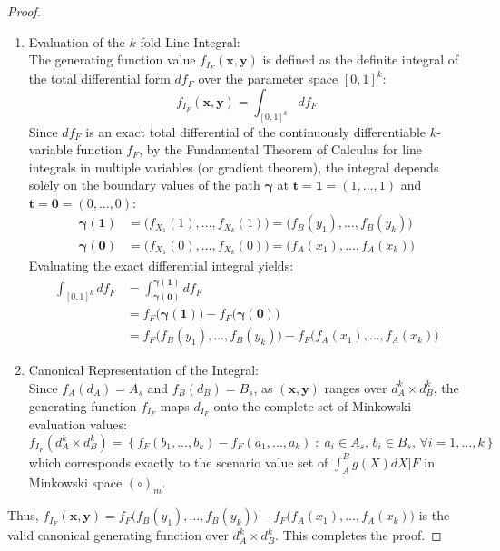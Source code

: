 \documentclass[a4paper,12pt, twoside]{memoir}
\begin{document}
\begin{proof}
\begin{enumerate}[leftmargin=*]
		\item Evaluation of the $k$-fold Line Integral: \\
		      The generating function value $f_{I_F}(\mathbf{x}, \mathbf{y})$ is defined as the definite integral of the total differential form $df_F$ over the parameter space $[0, 1]^k$:
		      \[
			      f_{I_F}(\mathbf{x}, \mathbf{y}) = \int_{[0, 1]^k} d f_F
		      \]
		      Since $df_F$ is an exact total differential of the continuously differentiable $k$-variable function $f_F$, by the Fundamental Theorem of Calculus for line integrals in multiple variables (or gradient theorem), the integral depends solely on the boundary values of the path $\boldsymbol{\gamma}$ at $\mathbf{t} = \mathbf{1} = (1, \dots, 1)$ and $\mathbf{t} = \mathbf{0} = (0, \dots, 0)$:
		      \begin{align*}
			      \boldsymbol{\gamma}(\mathbf{1}) & = \big(f_{X_1}(1), \dots, f_{X_k}(1)\big) = \big(f_B(y_1), \dots, f_B(y_k)\big) \\
			      \boldsymbol{\gamma}(\mathbf{0}) & = \big(f_{X_1}(0), \dots, f_{X_k}(0)\big) = \big(f_A(x_1), \dots, f_A(x_k)\big)
		      \end{align*}
		      Evaluating the exact differential integral yields:
		      \begin{align*}
			      \int_{[0, 1]^k} d f_F & = \int_{\boldsymbol{\gamma}(\mathbf{0})}^{\boldsymbol{\gamma}(\mathbf{1})} d f_F              \\
			                            & = f_F\big(\boldsymbol{\gamma}(\mathbf{1})\big) - f_F\big(\boldsymbol{\gamma}(\mathbf{0})\big) \\
			                            & = f_F\big(f_B(y_1), \dots, f_B(y_k)\big) - f_F\big(f_A(x_1), \dots, f_A(x_k)\big)
		      \end{align*}

		\item Canonical Representation of the Integral: \\
		      Since $f_A(d_A) = A_s$ and $f_B(d_B) = B_s$, as $(\mathbf{x}, \mathbf{y})$ ranges over $d_A^k \times d_B^k$, the generating function $f_{I_F}$ maps $d_{I_F}$ onto the complete set of Minkowski evaluation values:
		      \[
			      f_{I_F}(d_A^k \times d_B^k) = \left\{ f_F(b_1, \dots, b_k) - f_F(a_1, \dots, a_k) \;:\; a_i \in A_s, \, b_i \in B_s, \, \forall i=1,\dots,k \right\}
		      \]
		      which corresponds exactly to the scenario value set of $\int_A^B g(X)dX \Big| F$ in Minkowski space $(\circ)_m$.
	\end{enumerate}

	Thus, $f_{I_F}(\mathbf{x}, \mathbf{y}) = f_F\big(f_B(y_1), \dots, f_B(y_k)\big) - f_F\big(f_A(x_1), \dots, f_A(x_k)\big)$ is the valid canonical generating function over $d_A^k \times d_B^k$. This completes the proof.
\end{proof}
\end{document}
